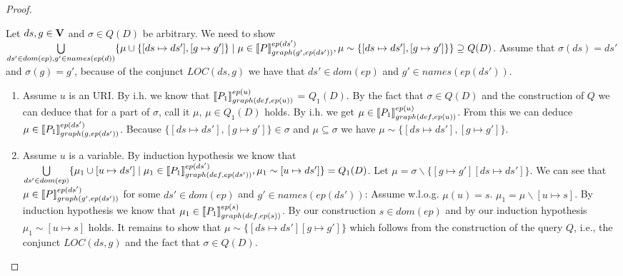 \begin{proof}
\begin{enumerate}
			\bigskip\noindent
			Let $ds,g \in \mathbf{V}$ and $\sigma \in Q(D)$ be arbitrary.
			We need to show  \\
			$\bigcup\limits_{ds' \in dom(ep), g' \in names(ep(d))} \{ \mu \cup
				\{[ds \mapsto ds'],[g \mapsto g']\} \mid\\ \mu \in
				\llbracket P\rrbracket^{ep(ds')}_{graph(g',ep(ds'))}, 
				\mu \sim
			\{[ds\mapsto ds'], [g \mapsto g']\}\} \supseteq Q(D) $. 	
			Assume that $\sigma(ds) = ds'$ and $\sigma(g) = g'$, because of the conjunct $LOC(ds,g)$
			we have that $ds' \in dom(ep)$ and $g' \in names(ep(ds'))$.
			\begin{enumerate}
				\item Assume $u$ is an URI. 
					By i.h. we know that 
					$\llbracket P_1 \rrbracket^{ep(u)}_{graph(def,ep(u))}$ =
					$Q_1(D)$. By the fact that $\sigma \in Q(D)$ and the
					construction of $Q$ we can deduce that for a part of $\sigma$,
					call it $\mu$, $\mu \in Q_1(D)$ holds. By i.h. we get
					$\mu \in  \llbracket P_1 \rrbracket^{ep(u)}_{graph(def,ep(u))}$.
					From this we can deduce $\mu \in  \llbracket P_1
					\rrbracket^{ep(ds')}_{graph(g,ep(ds'))}$. Because $\{[ds \mapsto
					ds'],[g \mapsto g']\} \in \sigma$ and $\mu \subseteq \sigma$ we have $\mu
					\sim \{[ ds \mapsto ds'], [g \mapsto g']\}$.

				\item Assume $u$ is a variable. By induction hypothesis we
					know that  $\bigcup\limits_{ds' \in dom(ep)} \{ \mu_1 \cup [u
						\mapsto ds'] \mid \mu_1 \in
						\llbracket P_1\rrbracket^{ep(ds')}_{graph(def,ep(ds'))},
					\mu_1 \sim [u\mapsto ds'] \}  = Q_1(D) $.
					Let $\mu = \sigma \backslash \{ [g
				\mapsto g'][ds \mapsto ds']\}$.
					We can see that $\mu \in \llbracket P
					\rrbracket^{ep(ds')}_{graph(g',ep(ds'))}$ for some $ds' \in
					dom(ep)$ and $g' \in names(ep(ds'))$:
					Assume w.l.o.g. $\mu(u) = s$.
					$\mu_1 = \mu \backslash [u \mapsto s]$. By induction hypothesis we know
					that $\mu_1 \in \llbracket P_1 \rrbracket^{ep(s)}_{graph(def,ep(s))}$. By our
					construction $s \in dom(ep)$ and by our induction hypothesis $\mu_1 \sim
					[u \mapsto s]$ holds. 
					It remains to show that $\mu \sim \{[ds \mapsto ds'] [g
					\mapsto g'] \}$
					which follows from the construction of the query $Q$, i.e., the conjunct
					$LOC(ds,g)$ and the fact that $\sigma \in Q(D)$.
			\end{enumerate}


\end{enumerate}
\end{proof}
